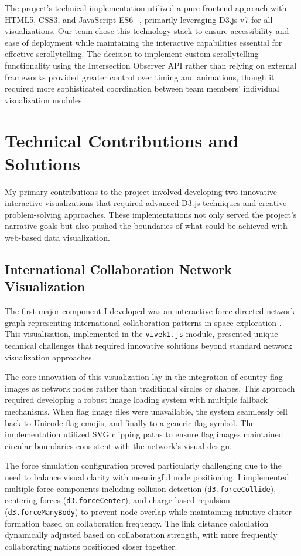 \documentclass[conference]{IEEEtran}
\begin{document}
The project's technical implementation utilized a pure frontend approach with HTML5, CSS3, and JavaScript ES6+, primarily leveraging D3.js v7 for all visualizations. Our team chose this technology stack to ensure accessibility and ease of deployment while maintaining the interactive capabilities essential for effective scrollytelling. The decision to implement custom scrollytelling functionality using the Intersection Observer API rather than relying on external frameworks provided greater control over timing and animations, though it required more sophisticated coordination between team members' individual visualization modules.

\section{Technical Contributions and Solutions}

My primary contributions to the project involved developing two innovative interactive visualizations that required advanced D3.js techniques and creative problem-solving approaches. These implementations not only served the project's narrative goals but also pushed the boundaries of what could be achieved with web-based data visualization.

\subsection{International Collaboration Network Visualization}

The first major component I developed was an interactive force-directed network graph representing international collaboration patterns in space exploration \cite{bostock2011d3}. This visualization, implemented in the \texttt{vivek1.js} module, presented unique technical challenges that required innovative solutions beyond standard network visualization approaches.

The core innovation of this visualization lay in the integration of country flag images as network nodes rather than traditional circles or shapes. This approach required developing a robust image loading system with multiple fallback mechanisms. When flag image files were unavailable, the system seamlessly fell back to Unicode flag emojis, and finally to a generic flag symbol. The implementation utilized SVG clipping paths to ensure flag images maintained circular boundaries consistent with the network's visual design.

The force simulation configuration proved particularly challenging due to the need to balance visual clarity with meaningful node positioning. I implemented multiple force components including collision detection (\texttt{d3.forceCollide}), centering forces (\texttt{d3.forceCenter}), and charge-based repulsion (\texttt{d3.forceManyBody}) to prevent node overlap while maintaining intuitive cluster formation based on collaboration frequency. The link distance calculation dynamically adjusted based on collaboration strength, with more frequently collaborating nations positioned closer together.
\end{document}
